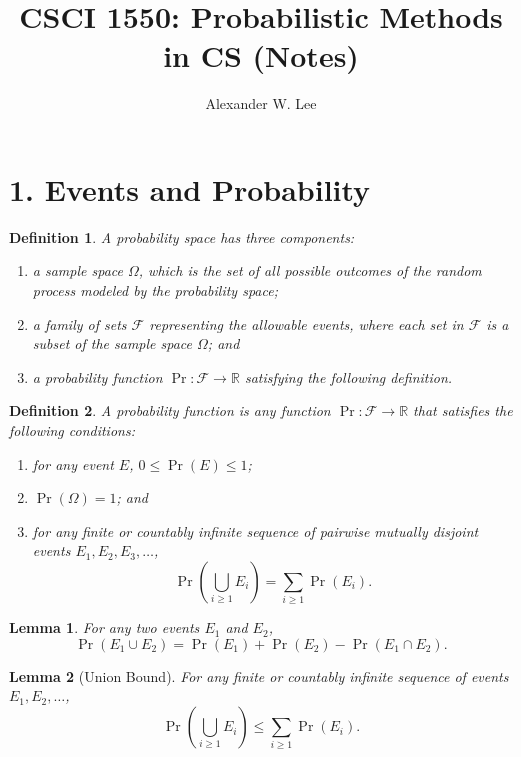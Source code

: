 \documentclass{amsart}
\title{CSCI 1550: Probabilistic Methods in CS (Notes)}
\author{Alexander W. Lee}
\newtheorem*{definition}{Definition}
\newtheorem*{lemma}{Lemma}
\newcommand{\R}{\mathbb{R}}
\begin{document}
\maketitle


\section*{1. Events and Probability}

\begin{definition}
  A probability space has three components:
  \begin{enumerate}
    \item a sample space $\Omega$, which is the set of all possible outcomes of
      the random process modeled by the probability space;
    \item a family of sets $\mathcal{F}$ representing the allowable events,
      where each set in $\mathcal{F}$ is a subset of the sample space $\Omega$;
      and
    \item a probability function $\Pr: \mathcal{F} \to \R$ satisfying the
      following definition.
  \end{enumerate}
\end{definition}

\begin{definition}
  A probability function is any function $\Pr: \mathcal{F} \to \R$ that
  satisfies the following conditions:
  \begin{enumerate}
    \item for any event $E$, $0 \leq \Pr(E) \leq 1$;
    \item $\Pr(\Omega) = 1$; and
    \item for any finite or countably infinite sequence of pairwise mutually
      disjoint events $E_1, E_2, E_3, \ldots$,
      \[
        \Pr \left( \bigcup_{i \geq 1} E_i \right) = \sum_{i \geq 1} \Pr(E_i).
      \]
  \end{enumerate}
\end{definition}

\begin{lemma}
  For any two events $E_1$ and $E_2$,
  \[
    \Pr(E_1 \cup E_2) = \Pr(E_1) + \Pr(E_2) - \Pr(E_1 \cap E_2).
  \]
\end{lemma}

\begin{lemma}[Union Bound]
  For any finite or countably infinite sequence of events $E_1, E_2, \ldots$,
  \[
    \Pr \left( \bigcup_{i \geq 1} E_i \right) \leq \sum_{i \geq 1} \Pr(E_i).
  \]
\end{lemma}
\end{document}
